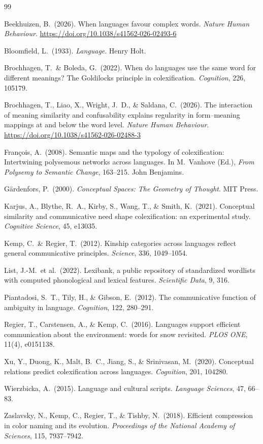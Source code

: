 \documentclass[12pt]{article}
\theoremstyle{rthm}
\theoremstyle{rdef}
\theoremstyle{remark}
\begin{document}
\begin{thebibliography}{99}

Beekhuizen, B.\ (2026).
When languages favour complex words.
\textit{Nature Human Behaviour}.
\url{https://doi.org/10.1038/s41562-026-02493-6}

Bloomfield, L.\ (1933).
\textit{Language}.
Henry Holt.

Brochhagen, T.\ \& Boleda, G.\ (2022).
When do languages use the same word for different meanings?
The Goldilocks principle in colexification.
\textit{Cognition}, 226, 105179.

Brochhagen, T., Liao, X., Wright, J.\ D., \& Saldana, C.\ (2026).
The interaction of meaning similarity and confusability explains regularity
in form--meaning mappings at and below the word level.
\textit{Nature Human Behaviour}.
\url{https://doi.org/10.1038/s41562-026-02488-3}

Fran\c{c}ois, A.\ (2008).
Semantic maps and the typology of colexification:
Intertwining polysemous networks across languages.
In M.\ Vanhove (Ed.),
\textit{From Polysemy to Semantic Change}, 163--215.
John Benjamins.

G\"{a}rdenfors, P.\ (2000).
\textit{Conceptual Spaces: The Geometry of Thought}.
MIT Press.

Karjus, A., Blythe, R.\ A., Kirby, S., Wang, T., \& Smith, K.\ (2021).
Conceptual similarity and communicative need shape colexification:
an experimental study.
\textit{Cognitive Science}, 45, e13035.

Kemp, C.\ \& Regier, T.\ (2012).
Kinship categories across languages reflect general communicative principles.
\textit{Science}, 336, 1049--1054.

List, J.-M.\ et al.\ (2022).
Lexibank, a public repository of standardized wordlists with computed
phonological and lexical features.
\textit{Scientific Data}, 9, 316.

Piantadosi, S.\ T., Tily, H., \& Gibson, E.\ (2012).
The communicative function of ambiguity in language.
\textit{Cognition}, 122, 280--291.

Regier, T., Carstensen, A., \& Kemp, C.\ (2016).
Languages support efficient communication about the environment:
words for snow revisited.
\textit{PLOS ONE}, 11(4), e0151138.

Xu, Y., Duong, K., Malt, B.\ C., Jiang, S., \& Srinivasan, M.\ (2020).
Conceptual relations predict colexification across languages.
\textit{Cognition}, 201, 104280.

Wierzbicka, A.\ (2015).
Language and cultural scripts.
\textit{Language Sciences}, 47, 66--83.

Zaslavsky, N., Kemp, C., Regier, T., \& Tishby, N.\ (2018).
Efficient compression in color naming and its evolution.
\textit{Proceedings of the National Academy of Sciences}, 115, 7937--7942.

\end{thebibliography}
\end{document}
